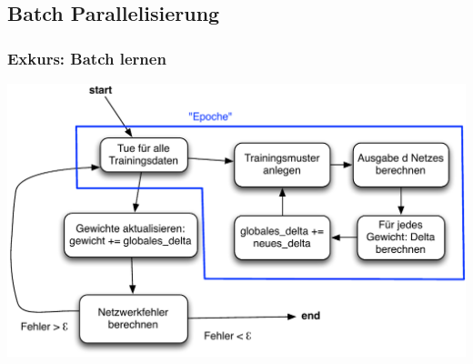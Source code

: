 \documentclass[18pt]{beamer}
\begin{document}
	\subsection{Batch Parallelisierung}
	\begin{frame}[c]\frametitle{Exkurs: Batch lernen}
		\begin{center}
			\includegraphics[scale=0.6]{Grafiken/Batchlearning.pdf}		    
		\end{center}	
	\end{frame}
\end{document}
